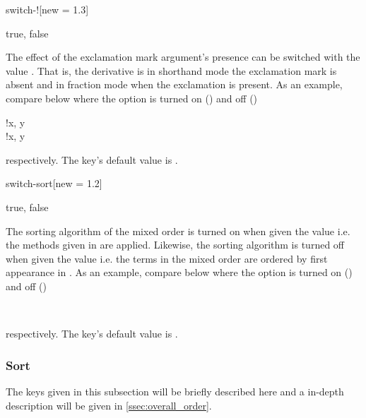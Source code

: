 \begin{option}{switch-!}[new = 1.3]
	\begin{values}[default = false]
		true, false
	\end{values}
	The effect of the exclamation mark argument's presence can be switched with the value . That is, the derivative is in shorthand mode the exclamation mark is absent and in fraction mode when the exclamation is present. As an example, compare below where the option is turned on () and off ()
	\begin{example}
		!{x, y} \\
		!{x, y}
	\end{example}
	respectively. The key's default value is \default.
\end{option}

\begin{option}{switch-sort}[new = 1.2]
	\begin{values}[default = true]
		true, false
	\end{values}
	The sorting algorithm of the mixed order is turned on when given the value  i.e. the methods given in  are applied. Likewise, the sorting algorithm is turned off when given the value  i.e. the terms in the mixed order are ordered by first appearance in . As an example, compare below where the option is turned on () and off (\val{false})
	\begin{example}
		\pdv[switch-sort=false, order={a+b,2kn-d,2-2b}]{f}{x,y,z} \\
		\pdv[switch-sort=true, order={a+b,2kn-d,2-2b}]{f}{x,y,z}
	\end{example}
	respectively. The key's default value is .
\end{option}

\subsubsection*{Sort}
The keys given in this subsection will be briefly described here and a in-depth description will be given in \cref{ssec:overall_order}.


